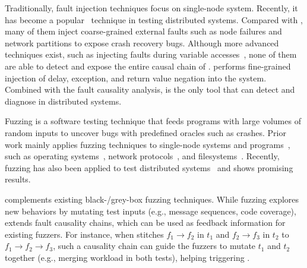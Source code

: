 Traditionally, 
fault injection techniques
\cite{hsueh1997fault,
marinescu2009lfi, 
natella2016assessing,bai2016testing,bai2016mining}
focus on 
single-node system. 
Recently, 
it has become a popular~\cite{alquraan2018analysis, chen2020cofi, ganesan2017redundancy, gunawi2011fate, lu2019crashtuner, 
marinescu2009lfi,
alvaro2015lineage,
joshi2011prefail,
ju2013fault,
mohan2018finding,
li2019efficient,
sun2022automatic,
meiklejohn2021service,
zhang20213milebeach,
chen2023push,
jepsenio} 
technique in testing distributed systems. Compared with \tool, many of them inject coarse-grained external faults such as node failures and network partitions to expose crash recovery bugs. Although more advanced techniques exist, such as injecting faults during variable accesses~\cite{lu2019crashtuner}, none of them are able to detect and expose the entire causal chain of \vcs. \tool performs fine-grained injection of delay, exception, and return value negation into the system. Combined with the fault causality analysis, \tool is the only tool that can detect and diagnose \vcs in distributed systems.

Fuzzing is a software testing technique that feeds programs with large volumes of random
inputs to uncover bugs with predefined oracles such as crashes. Prior work mainly applies fuzzing techniques to single-node systems and programs~\cite{jiang2020fuzzing, jiang2022context, xie2022rozz, gao2025detecting, jiang2023dynsql, bai2024multi,bai2023testing, afl, AFLplusplus-Woot20, bohme2017directed, dinesh2020retrowrite}, such as operating systems~\cite{vyukov2015syzkaller,gong2025snowplow,sun2021healer,jiang2019fuzzing}, network protocols~\cite{zou2021tcp,pham2020aflnet}, and filesystems~\cite{jiang2022context,kim2019finding}. Recently, fuzzing has also been applied to test distributed systems~\cite{crashfuzz, meng2023greybox, zou2025blackbox} and shows promising results.

\tool complements existing black-/grey-box fuzzing techniques. While fuzzing explores new behaviors by mutating test inputs (e.g., message sequences, code coverage), \tool extends fault causality chains, which can be used as feedback information for existing fuzzers. For instance, when \tool stitches $f_1 \rightarrow f_2$ in $t_1$ and $f_2 \rightarrow f_3$ in $t_2$ to $f_1 \rightarrow f_2 \rightarrow f_3$, such a causality chain can guide the fuzzers to mutate $t_1$ and $t_2$ together (e.g., merging workload in both tests), helping triggering \vcs.

